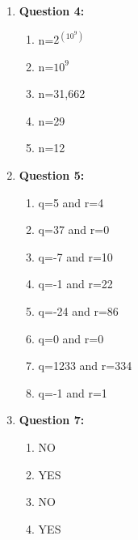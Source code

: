 \documentclass[11pt]{article}
\begin{document}
\begin{enumerate}
\begin{enumerate}[label=(\alph*)]
\end{enumerate}

\item
\textbf{Question 4:}

\begin{enumerate}[label=(\alph*)]
\item
n=$2^(10^9)$

\item
n=$10^9$

\item
n=31,662

\item
 n=29

\item
n=12

\end{enumerate}

\item
\textbf{Question 5:}

\begin{enumerate}[label=(\alph*)]
\item
q=5 and r=4

\item
q=37 and r=0

\item
q=-7 and r=10

\item
q=-1 and r=22

\item
q=-24 and r=86

\item
q=0 and r=0

\item
q=1233 and r=334

\item
q=-1 and r=1

\end{enumerate}

\item
\textbf{Question 7:}

\begin{enumerate}[label=(\alph*)]
\item
NO

\item
YES

\item
NO

\item
YES

\end{enumerate}


\end{enumerate}
\end{document}
